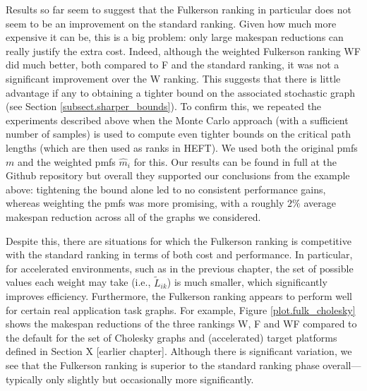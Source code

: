 \documentclass[12pt]{article}
\begin{document}
Results so far seem to suggest that the Fulkerson ranking in particular does not seem to be an improvement on the standard ranking. Given how much more expensive it can be, this is a big problem: only large makespan reductions can really justify the extra cost. Indeed, although the weighted Fulkerson ranking WF did much better, both compared to F and the standard ranking, it was not a significant improvement over the W ranking. This suggests that there is little advantage if any to obtaining a tighter bound on the associated stochastic graph (see Section \ref{subsect.sharper_bounds}). To confirm this, we repeated the experiments described above when the Monte Carlo approach (with a sufficient number of samples) is used to compute even tighter bounds on the critical path lengths (which are then used as ranks in HEFT). We used both the original pmfs $m$ and the weighted pmfs $\hat{m}_i$ for this. Our results can be found in full at the Github repository but overall they supported our conclusions from the example above: tightening the bound alone led to no consistent performance gains, whereas weighting the pmfs was more promising, with a roughly $2\%$ average makespan reduction across all of the graphs we considered.       

Despite this, there are situations for which the Fulkerson ranking is competitive with the standard ranking in terms of both cost and performance. In particular, for accelerated environments, such as in the previous chapter, the set of possible values each weight may take (i.e., $\tilde{L}_{ik}$) is much smaller, which significantly improves efficiency. Furthermore, the Fulkerson ranking appears to perform well for certain real application task graphs. For example, Figure \ref{plot.fulk_cholesky} shows the makespan reductions of the three rankings W, F and WF compared to the default for the set of Cholesky graphs and (accelerated) target platforms defined in Section X [earlier chapter]. Although there is significant variation, we see that the Fulkerson ranking is superior to the standard ranking phase overall---typically only slightly but occasionally more significantly.   
\end{document}

